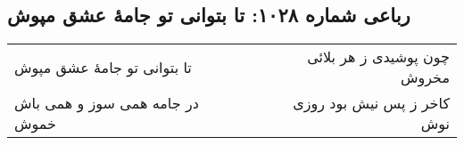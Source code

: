 \begin{center}
\section*{رباعی شماره ۱۰۲۸: تا بتوانی تو جامهٔ عشق مپوش}
\label{sec:1028}
\begin{longtable}{l p{0.5cm} r}
تا بتوانی تو جامهٔ عشق مپوش
&&
چون پوشیدی ز هر بلائی مخروش
\\
در جامه همی سوز و همی باش خموش
&&
کاخر ز پس نیش بود روزی نوش
\\
\end{longtable}
\end{center}
